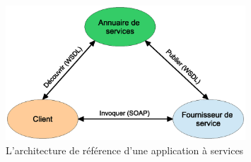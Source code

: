 \begin{figure}[h]
    \centering
    \includegraphics[width=0.8\textwidth]{figs/ws-basic-arch.eps}
    \caption{L'architecture de référence d'une application à services}
    \label{fig:ws-basic-arch}
\end{figure}